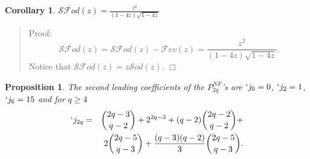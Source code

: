 \documentclass[preprint,authoryear]{elsarticle}
\newenvironment{proof}[1]{\begin{quotation}\noindent\textsf{Proof:} #1}{\(\Box\)\end{quotation}}
\newtheorem{prop}{Proposition}
\newtheorem{corollary}{Corollary}
\newcommand{\Sod}{\mathcal{S}od}
\newcommand{\Fev}{\mathcal{F}ev}
\newcommand{\SFod}{\mathcal{SF}od}
\newcommand{\SFodb}{\overline{\mathcal{SF}od}}
\begin{document}
\begin{corollary}
  \begin{math}
  \SFodb(z) = \frac{z^2}{(1-4z)\sqrt{1-4z}}
\end{math}
\end{corollary}
\begin{proof}{}
  \[\SFodb(z) = \SFod(z) -\Fev(z) = \frac{z^2}{(1-4z)\sqrt{1-4z}}.\]
Notice that $\SFodb(z) = z\Sod(z)$.
\end{proof}
\begin{prop}
  The second leading coefficients of  the $P^{NF}_{2q}$'s are $`j_0=0$, ${`j_{2} = 1}$,
  $`j_6 = 15$ and for $q\ge 4$
\begin{eqnarray*}
  `j_{2q} &=& {2q-3 \choose q-2} + 2^{2q-3} + (q-2){2q-2 \choose q-2} + \\
  && 2{2q-5 \choose q-3} + \frac{(q-3)(q-2)}{3}{2q-5 \choose q-3}.
\end{eqnarray*}
\end{prop}
\end{document}
